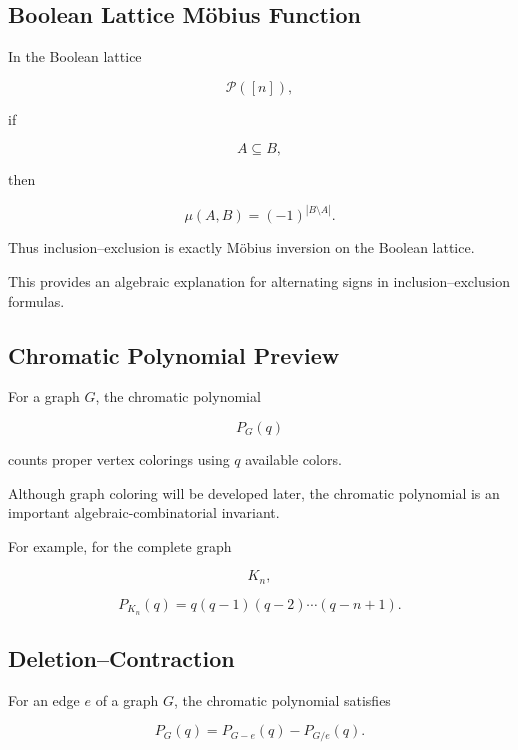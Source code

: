 \subsection{Boolean Lattice Möbius Function}
\label{subsec:boolean-lattice-mobius}

In the Boolean lattice

\[
\mathcal{P}([n]),
\]

if

\[
A\subseteq B,
\]

then

\[
\boxed{
\mu(A,B)
=
(-1)^{|B\setminus A|}.
}
\]

Thus inclusion--exclusion is exactly Möbius inversion on the Boolean
lattice.

This provides an algebraic explanation for alternating signs in
inclusion--exclusion formulas.

\subsection{Chromatic Polynomial Preview}
\label{subsec:chromatic-polynomial-preview}

For a graph \(G\), the chromatic polynomial

\[
\boxed{
P_G(q)
}
\]

counts proper vertex colorings using \(q\) available colors.

Although graph coloring will be developed later, the chromatic
polynomial is an important algebraic-combinatorial invariant.

For example, for the complete graph

\[
K_n,
\]

\[
\boxed{
P_{K_n}(q)
=
q(q-1)(q-2)\cdots(q-n+1).
}
\]

\subsection{Deletion--Contraction}
\label{subsec:deletion-contraction-preview}

For an edge \(e\) of a graph \(G\), the chromatic polynomial satisfies

\[
\boxed{
P_G(q)
=
P_{G-e}(q)
-
P_{G/e}(q).
}
\]

